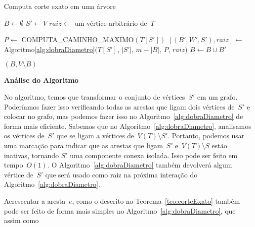 \documentclass[a4paper,12pt]{article}
\begin{document}
		\bigskip
		\bigskip
		\begin{algorithm}[H]
		\label{alg:corteExato}

			\caption{Computa corte exato em uma árvore}
			$B\gets \emptyset$\;
			$S'\gets V$\;
			$raiz\gets$ um vértice arbitrário de~$T$\;
	
			{
				$P\gets$ COMPUTA\_CAMINHO\_MAXIMO$(T[S'])$\;
				$[(B',W',S'), raiz]\gets$
				Algoritmo\ref{alg:dobraDiametro}$(T[S']$,
				$|S'|$, $m-|B|$, $P$, $raiz)$\;
				$B\gets B\cup B'$\;

			}
			\Return $(B,V\setminus B)$\;

		\end{algorithm}	

		\bigskip
		\bigskip
		\bigskip

		\textbf{Análise do Algoritmo}


		No algoritmo, temos que transformar o conjunto de 
		vértices~$S'$ em um grafo. 
		Poderíamos fazer isso verificando todas as arestas que 
		ligam dois vértices de~$S'$ e colocar no grafo, mas podemos
		fazer isso no Algoritmo~\ref{alg:dobraDiametro} de forma 
		mais eficiente. 
		Sabemos que no Algoritmo~\ref{alg:dobraDiametro},
		analisamos os vértices de~$S'$ que se ligam a vértices 
		de~$V(T)\setminus S'$. 
		Portanto, podemos usar uma marcação para indicar que as 
		arestas que ligam~$S'$ e~$V(T)\setminus S$ estão inativas, 
		tornando $S'$ uma componente conexa isolada. 
		Isso pode ser feito em tempo~$O(1)$.
		O Algoritmo~\ref{alg:dobraDiametro} também devolverá 
		algum vértice de~$S'$ que será usado como raiz na 
		próxima interação do Algoritmo~\ref{alg:dobraDiametro}.

		Acrescentar a aresta~$e$, como o descrito no
		Teorema~\ref{teo:corteExato} também pode ser feito de 
		forma mais simples no Algoritmo~\ref{alg:dobraDiametro},
		que assim como 
\end{document}

